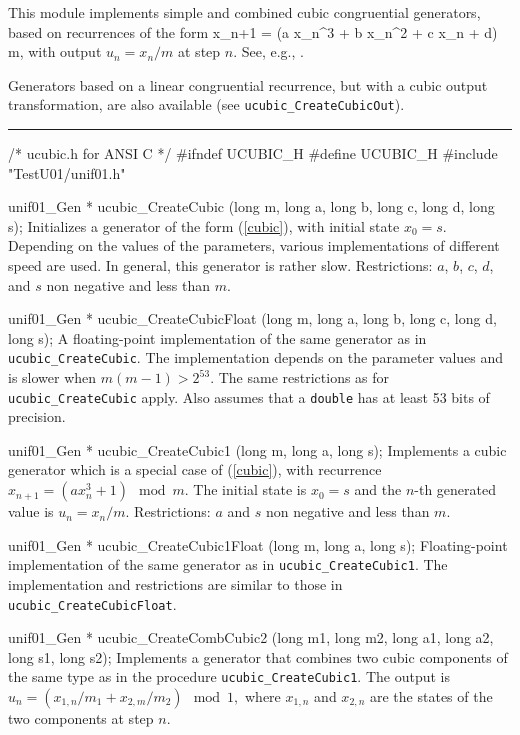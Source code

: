 
This module implements simple and combined cubic congruential
generators, based on recurrences of the form
\eq
  x_{n+1} = (a x_n^3 + b x_n^2 + c x_n + d) \mod m,   
\endeq
with output $u_n = x_n/m$ at step $n$.
See, e.g., \cite{rEIC97a,rLEC98h}.

Generators based on a linear congruential recurrence, but with
a cubic output transformation, are also available
(see {\tt ucubic\_CreateCubicOut}).


\bigskip
\hrule
\code
\hide
/* ucubic.h for ANSI C */
#ifndef UCUBIC_H
#define UCUBIC_H
\endhide
#include "TestU01/unif01.h"


unif01_Gen * ucubic_CreateCubic (long m, long a, long b, long c, long d,
                                 long s);
\endcode
  \tab  Initializes a generator of the form (\ref{cubic}), with
   initial state $x_0 = s$.
%
   Depending on the values of the parameters, various implementations
   of different speed are used.
   In general, this generator is rather slow.
   Restrictions: $a$, $b$, $c$, $d$, and $s$ non
   negative and less than $m$.
 \endtab
\code


unif01_Gen * ucubic_CreateCubicFloat (long m, long a, long b, long c,
                                      long d, long s);
\endcode
  \tab A floating-point implementation of the same generator as in
   {\tt ucubic\_CreateCubic}.
   The implementation depends on the parameter values and is slower
   when $m(m-1) > 2^{53}$.
   The same restrictions as for {\tt ucubic\_CreateCubic} apply.
   Also assumes that a {\tt double} has at least 53 bits of precision.
 \endtab
\code


unif01_Gen * ucubic_CreateCubic1 (long m, long a, long s);
\endcode
  \tab  Implements a cubic generator which is a special case of
   (\ref{cubic}), with recurrence  $x_{n+1} = (a x_n^3 + 1) \mod m$.
   The  initial state is $x_0 = s$ and the $n$-th generated value
   is $u_n = x_n/m$.
   Restrictions: $a$ and $s$ non negative and less than  $m$.
 \endtab
\code


unif01_Gen * ucubic_CreateCubic1Float (long m, long a, long s);
\endcode
  \tab Floating-point implementation of the same generator as in
  {\tt ucubic\_CreateCubic1}.  The implementation and restrictions are
  similar to those in {\tt ucubic\_CreateCubicFloat}.
 \endtab
\code


unif01_Gen * ucubic_CreateCombCubic2 (long m1, long m2, long a1, long a2,
                                      long s1, long s2);
\endcode
  \tab  Implements a generator that combines two cubic components
   of the same type as in the procedure {\tt ucubic\_CreateCubic1}.
  The output is
    $ u_n = (x_{1,n}/m_1 + x_{2,m}/m_2)  \mod 1, $
   where $x_{1,n}$ and $x_{2,n}$ are the states of the two components
   at step $n$.
 \endtab
\code


